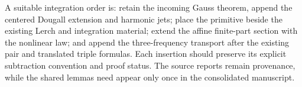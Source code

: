 A suitable integration order is: retain the incoming Gauss theorem,
append the centered Dougall extension and harmonic jets; place the
primitive beside the existing Lerch and integration material; extend
the affine finite-part section with the nonlinear law; and append the
three-frequency transport after the existing pair and translated
triple formulas. Each insertion should preserve its explicit
subtraction convention and proof status. The source reports remain
provenance, while the shared lemmas need appear only once in the
consolidated manuscript.
